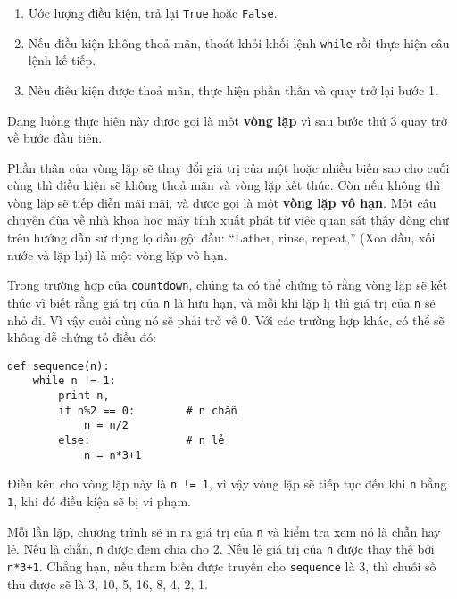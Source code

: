 \documentclass[11pt]{book}
\begin{document}
\begin{enumerate}

\item Ước lượng điều kiện, trả lại {\tt True} hoặc {\tt False}.

\item Nếu điều kiện không thoả mãn, thoát khỏi khối lệnh {\tt while} 
rồi thực hiện câu lệnh kế tiếp.

\item Nếu điều kiện được thoả mãn, thực hiện phần thần và quay trở lại
bước 1.

\end{enumerate}

Dạng luồng thực hiện này được gọi là một {\bf vòng lặp} vì sau bước thứ 3
quay trở về bước đầu tiên.


Phần thân của vòng lặp sẽ thay đổi giá trị của một hoặc nhiều biến sao cho 
cuối cùng thì điều kiện sẽ không thoả mãn và vòng lặp kết thúc. Còn nếu 
không thì vòng lặp sẽ tiếp diễn mãi mãi, và được gọi là một
{\bf vòng lặp vô hạn}. Một câu chuyện đùa về nhà khoa học máy tính xuất
phát từ việc quan sát thấy dòng chữ trên hướng dẫn sử dụng lọ dầu gội đầu:
``Lather, rinse, repeat,'' (Xoa dầu, xối nước và lặp lại) là một vòng lặp vô hạn.


Trong trường hợp của {\tt countdown}, chúng ta có thể chứng tỏ rằng
vòng lặp sẽ kết thúc vì biết rằng giá trị của {\tt n} là hữu hạn, và mỗi
khi lặp lị thì giá trị của {\tt n} sẽ nhỏ đi. Vì vậy cuối cùng nó sẽ phải
trở về 0. Với các trường hợp khác, có thể sẽ không dễ chứng tỏ điều đó:

\beforeverb
\begin{verbatim}
def sequence(n):
    while n != 1:
        print n,
        if n%2 == 0:        # n chẵn
            n = n/2
        else:               # n lẻ 
            n = n*3+1
\end{verbatim}
\afterverb
%

Điều kện cho vòng lặp này là {\tt n != 1}, vì vậy vòng lặp sẽ tiếp tục
đến khi {\tt n} bằng {\tt 1}, khi đó điều kiện sẽ bị vi phạm.

Mỗi lần lặp, chương trình sẽ in ra giá trị của {\tt n} và kiểm tra xem
nó là chẵn hay lẻ. Nếu là chẵn, {\tt n} được đem chia cho 2. Nếu lẻ 
giá trị của {\tt n} được thay thế bởi {\tt n*3+1}. Chẳng hạn, nếu tham
biến được truyền cho {\tt sequence} là 3, thì chuỗi số thu được sẽ là
 3, 10, 5, 16, 8, 4, 2, 1.
\end{document}
